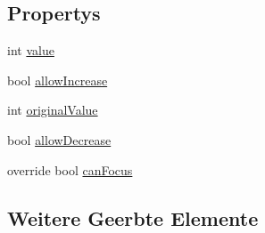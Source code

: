 \subsection*{Propertys}
\begin{DoxyCompactItemize}
\item 
int \hyperlink{class_gruppe22_1_1_client_1_1_number_entry_a3164c478660266404474cd85491db5dc}{value}
\item 
bool \hyperlink{class_gruppe22_1_1_client_1_1_number_entry_ab2e9964f2a930a81153ba75e29c0e516}{allow\-Increase}
\item 
int \hyperlink{class_gruppe22_1_1_client_1_1_number_entry_a90ab861f29fca9349151bfd7d25b2864}{original\-Value}
\item 
bool \hyperlink{class_gruppe22_1_1_client_1_1_number_entry_a8805cd126c619a1e1d412186db7566e9}{allow\-Decrease}
\item 
override bool \hyperlink{class_gruppe22_1_1_client_1_1_number_entry_ac2d593413d374a96922404868e37be47}{can\-Focus}
\end{DoxyCompactItemize}
\subsection*{Weitere Geerbte Elemente}


